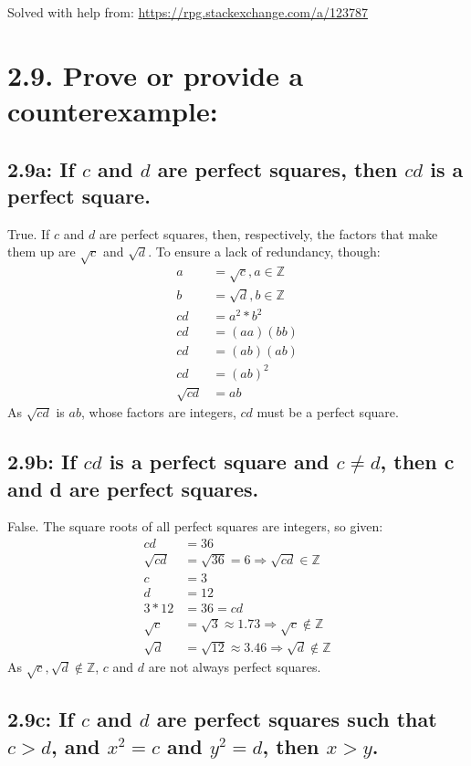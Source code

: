 \documentclass{article}
\begin{document}
Solved with help from: \url{https://rpg.stackexchange.com/a/123787}

\section*{2.9. Prove or provide a counterexample:}

\subsection*{2.9a: If $c$ and $d$ are perfect squares, then $cd$ is a perfect square.}

True. If $c$ and $d$ are perfect squares, then, respectively, the factors that make them up are $\sqrt{c}$ and $\sqrt{d}$. To ensure a lack of redundancy, though:
\begin{align*}
  a&=\sqrt{c},a\in\mathbb{Z}\\
  b&=\sqrt{d},b\in\mathbb{Z}\\
  cd&=a^2*b^2\\
  cd&=(aa)(bb)\\
  cd&=(ab)(ab)\\
  cd&=(ab)^2\\
  \sqrt{cd}&=ab
\end{align*}
As $\sqrt{cd}$ is $ab$, whose factors are integers, $cd$ must be a perfect square.

\subsection*{2.9b: If $cd$ is a perfect square and $c\neq d$, then c and d are perfect squares.}

False. The square roots of all perfect squares are integers, so given:
\begin{align*}
  cd&=36\\
  \sqrt{cd}&=\sqrt{36}=6\Rightarrow\sqrt{cd}\in\mathbb{Z}\\
  c&=3\\
  d&=12\\
  3*12&=36=cd\\
  \sqrt{c}&=\sqrt{3}\approx1.73\Rightarrow\sqrt{c}\not\in\mathbb{Z}\\
  \sqrt{d}&=\sqrt{12}\approx3.46\Rightarrow\sqrt{d}\not\in\mathbb{Z}
\end{align*}
As $\sqrt{c},\sqrt{d}\not\in\mathbb{Z}$, $c$ and $d$ are not always perfect squares.

\subsection*{2.9c: If $c$ and $d$ are perfect squares such that $c>d$, and $x^2=c$ and $y^2=d$, then $x>y$.}
\end{document}
